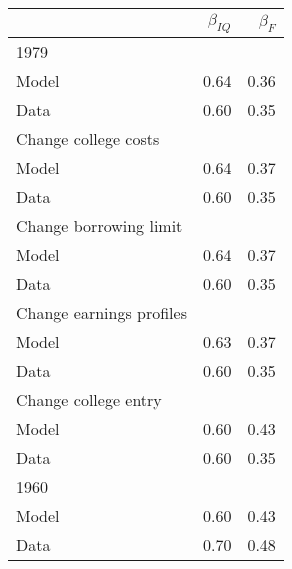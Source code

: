 \begin{tabular}{lrr}
\hline
  & $\beta_{IQ}$  & $\beta_{F}$  \\ 
\hline
1979 &   &   \\ 
Model & 0.64  & 0.36  \\ 
Data & 0.60  & 0.35  \\ 
Change college costs &   &   \\ 
Model & 0.64  & 0.37  \\ 
Data & 0.60  & 0.35  \\ 
Change borrowing limit &   &   \\ 
Model & 0.64  & 0.37  \\ 
Data & 0.60  & 0.35  \\ 
Change earnings profiles &   &   \\ 
Model & 0.63  & 0.37  \\ 
Data & 0.60  & 0.35  \\ 
Change college entry &   &   \\ 
Model & 0.60  & 0.43  \\ 
Data & 0.60  & 0.35  \\ 
1960 &   &   \\ 
Model & 0.60  & 0.43  \\ 
Data & 0.70  & 0.48  \\ 
\hline
\end{tabular}%
